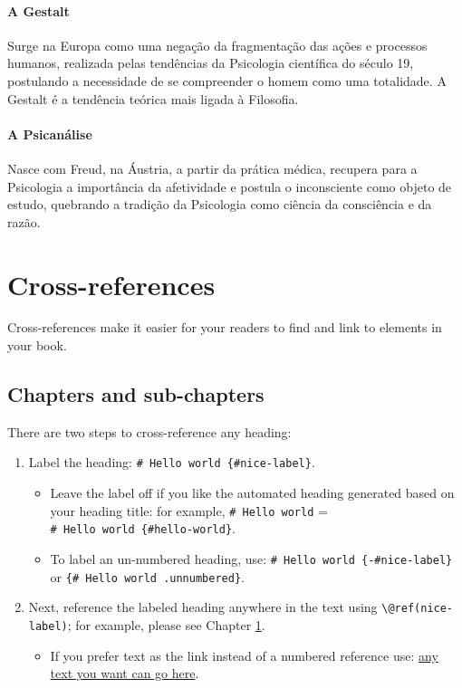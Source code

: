 \documentclass[
]{book}
\providecommand{\tightlist}{%
  \setlength{\itemsep}{0pt}\setlength{\parskip}{0pt}}
\theoremstyle{definition}
\theoremstyle{definition}
\theoremstyle{definition}
\theoremstyle{definition}
\theoremstyle{remark}
\begin{document}
\hypertarget{a-gestalt}{%
\subsubsection{A Gestalt}\label{a-gestalt}}

Surge na Europa como uma negação da fragmentação das ações e processos humanos, realizada pelas tendências da Psicologia científica do século 19, postulando a necessidade de se compreender o homem como uma totalidade. A Gestalt é a tendência teórica mais ligada à Filosofia.

\hypertarget{a-psicanuxe1lise}{%
\subsubsection{A Psicanálise}\label{a-psicanuxe1lise}}

Nasce com Freud, na Áustria, a partir da prática médica, recupera para a Psicologia a importância da afetividade e postula o inconsciente como objeto de estudo, quebrando a tradição da Psicologia como ciência da consciência e da razão.

\hypertarget{cross}{%
\chapter{Cross-references}\label{cross}}

Cross-references make it easier for your readers to find and link to elements in your book.

\hypertarget{chapters-and-sub-chapters}{%
\section{Chapters and sub-chapters}\label{chapters-and-sub-chapters}}

There are two steps to cross-reference any heading:

\begin{enumerate}
\def\labelenumi{\arabic{enumi}.}
\tightlist
\item
  Label the heading: \texttt{\#\ Hello\ world\ \{\#nice-label\}}.

  \begin{itemize}
  \tightlist
  \item
    Leave the label off if you like the automated heading generated based on your heading title: for example, \texttt{\#\ Hello\ world} = \texttt{\#\ Hello\ world\ \{\#hello-world\}}.
  \item
    To label an un-numbered heading, use: \texttt{\#\ Hello\ world\ \{-\#nice-label\}} or \texttt{\{\#\ Hello\ world\ .unnumbered\}}.
  \end{itemize}
\item
  Next, reference the labeled heading anywhere in the text using \texttt{\textbackslash{}@ref(nice-label)}; for example, please see Chapter \ref{cross}.

  \begin{itemize}
  \tightlist
  \item
    If you prefer text as the link instead of a numbered reference use: \protect\hyperlink{cross}{any text you want can go here}.
  \end{itemize}
\end{enumerate}
\end{document}
